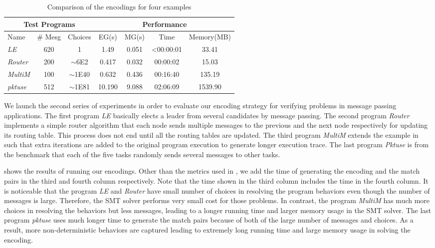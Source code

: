 \begin{table}
\begin{center}
\setlength{\tabcolsep}{2pt}
\scriptsize
\begin{tabular}{|l|c|c|c|c|c|c|}
		\hline
         \multicolumn{3}{|c|}{Test Programs} & \multicolumn{4}{|c|}{Performance} \\ \hline
         Name & \# Mesg & Choices & EG(s) & MG(s) & Time & Memory(MB) \\ \hline
         \textit{LE} & 620 & 1 & 1.49 & 0.051 & <00:00:01 & 33.41  \\
         \textit{Router} & 200 & $\sim$6E2 & 0.417 & 0.032 & 00:00:02 & 15.03  \\
         \textit{MultiM} & 100 & $\sim$1E40 & 0.632 & 0.436 &  00:16:40 & 135.19  \\
         \textit{pktuse} & 512 & $\sim$1E81 & 10.190 & 9.088 & 02:06:09 & 1539.90 \\
         \hline
		\end{tabular}
\end{center}
\caption{Comparison of the encodings for four examples}
\label{table:second}
\end{table}
We launch the second series of experiments in order to evaluate our encoding strategy for verifying problems in message passing applications. The first program \textit{LE} basically elects a leader from several candidates by message passing. The second program \textit{Router} implements a simple router algorithm that each node sends multiple messages to the previous and the next node respectively for updating its routing table. This process does not end until all the routing tables are updated. The third program \textit{MultiM} extends the example in  such that extra iterations are added to the original program execution to generate longer execution trace. The last program \textit{Pktuse} is from the benchmark \cite{mpptest_benchmark} that each of the five tasks randomly sends several messages to other tasks.

 shows the results of running our encodings. Other than the metrics used in , we add the time of generating the encoding and the match pairs in the third and fourth column respectively. Note that the time shown in the third column includes the time in the fourth column. It is noticeable that the program \textit{LE} and \textit{Router} have small number of choices in resolving the program behaviors even though the number of messages is large. Therefore, the SMT solver performs very small cost for those problems. In contrast, the program \textit{MultiM} has much more choices in resolving the behaviors but less messages, leading to a longer running time and larger memory usage in the SMT solver. The last program \textit{pktuse} uses much longer time to generate the match pairs because of both of the large number of messages and choices. As a result, more non-deterministic behaviors are captured leading to extremely long running time and large memory usage in solving the encoding.

